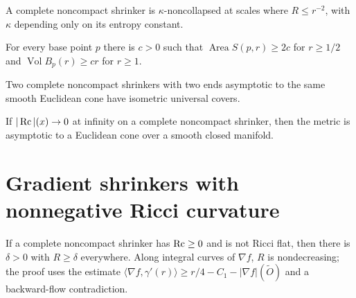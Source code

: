 \begin{corollary}
\label{cor:chow-iv-shrinker-noncollapsing}
A complete noncompact shrinker is $\kappa$-noncollapsed at scales where
$R\le r^{-2}$, with $\kappa$ depending only on its entropy constant.
\end{corollary}

\begin{theorem}
\label{thm:chow-iv-shrinker-linear-growth}
For every base point $p$ there is $c>0$ such that
$\operatorname{Area}S(p,r)\ge2c$ for $r\ge1/2$ and
$\operatorname{Vol}B_p(r)\ge cr$ for $r\ge1$.
\end{theorem}

\begin{theorem}
\label{thm:chow-iv-asymptotic-cone-uniqueness}
Two complete noncompact shrinkers with two ends asymptotic to the same smooth
Euclidean cone have isometric universal covers.
\end{theorem}

\begin{theorem}
\label{thm:chow-iv-asymptotic-cone}
If $|\operatorname{Rc}|(x)\to0$ at infinity on a complete noncompact shrinker, then the
metric is asymptotic to a Euclidean cone over a smooth closed manifold.
\end{theorem}

\section{Gradient shrinkers with nonnegative Ricci curvature}

\begin{theorem}
\label{thm:chow-iv-positive-scalar-shrinker}
If a complete noncompact shrinker has $\operatorname{Rc}\ge0$ and is not Ricci flat, then
there is $\delta>0$ with $R\ge\delta$ everywhere.  Along integral curves of
$\nabla f$, $R$ is nondecreasing; the proof uses the estimate
$\langle\nabla f,\gamma'(r)\rangle\ge r/4-C_1-|\nabla f|(\widetilde O)$
and a backward-flow contradiction.
\end{theorem}

